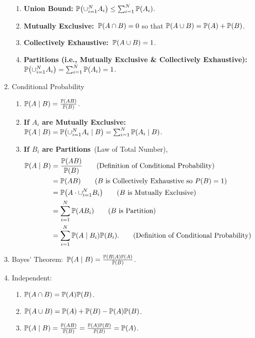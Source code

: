 \begin{enumerate}
\begin{enumerate}
        \item \textbf{Union Bound:} $\P{\cup_{i=1}^N A_i}\leq \sum_{i=1}^{N}\P{A_i}$.
        \item \textbf{Mutually Exclusive:}~$\P{A \cap B}=0$ so that $\P{A \cup B} = \P{A}+\P{B}$.
        \item \textbf{Collectively Exhaustive:}~$\P{A\cup B}=1$.
        \item \textbf{Partitions (i.e., Mutually Exclusive \& Collectively Exhaustive):}~$\P{\cup_{i=1}^N A_i}=\sum_{i=1}^{N}\P{A_i}=1$.
    \end{enumerate}
    \item Conditional Probability
    \begin{enumerate}
        \item $\condP{A}{B} = \frac{\P{AB}}{\P{B}}$.
        \item \textbf{If $A_i$ are Mutually Exclusive:}~$\condP{A}{B} = \condP{\cup_{i=1}^{N}A_i}{B} = \sum_{i=1}^{N}\condP{A_i}{B}$.
        \item \textbf{If $B_i$ are Partitions}~(Law of Total Number),
        \begin{align}
             \condP{A}{B} 
             &= \frac{\P{AB}}{\P{B}}  \tag{Definition of Conditional Probability}\\
             &= \P{AB}  \tag{$B$ is Collectively Exhaustive so $P(B)=1$} \\
             &= \P{A\cdot\cup_{i=1}^{N}B_i}  \tag{$B$ is Mutually Exclusive} \\
             &= \sum_{i=1}^{N}\P{AB_i}  \tag{$B$ is Partition} \\
             &= \sum_{i=1}^{N}\condP{A}{B_i}\P{B_i}. \tag{Definition of Conditional Probability}
        \end{align}
    \end{enumerate}
    \item Bayes' Theorem:~$\condP{A}{B} = \frac{\condP{B}{A}\P{A}}{\P{B}}$.
    \item Independent:{
        \begin{enumerate}
            \item $\P{A\cap B}=\P{A}\P{B}$.
            \item $\P{A \cup B} = \P{A}+\P{B}-\P{A}\P{B}$.
            \item $\condP{A}{B} = \frac{\P{AB}}{\P{B}}=\frac{\P{A}\P{B}}{\P{B}}=\P{A}$.
        \end{enumerate}
    } 
\end{enumerate}